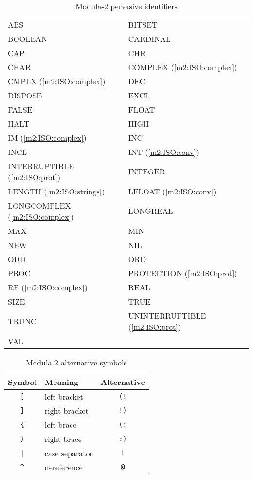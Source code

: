 \begin{table}[hbtp] \tt
\footnotesize
\begin{center}
\begin{tabular}{p{5.0cm}p{5.0cm}}
ABS             & BITSET    \\
BOOLEAN         & CARDINAL  \\
CAP             & CHR             \\
CHAR            & COMPLEX (\ref{m2:ISO:complex})  \\
CMPLX (\ref{m2:ISO:complex})  &  DEC             \\
DISPOSE         & EXCL            \\
FALSE           & FLOAT     \\
HALT            & HIGH      \\
IM (\ref{m2:ISO:complex})       & INC             \\
INCL            & INT (\ref{m2:ISO:conv})      \\
INTERRUPTIBLE (\ref{m2:ISO:prot})  & INTEGER   \\
LENGTH (\ref{m2:ISO:strings})   & LFLOAT (\ref{m2:ISO:conv})         \\
LONGCOMPLEX (\ref{m2:ISO:complex})    & LONGREAL  \\
MAX             & MIN             \\
NEW             & NIL             \\
ODD             & ORD             \\
PROC            & PROTECTION (\ref{m2:ISO:prot})     \\
RE (\ref{m2:ISO:complex})       & REAL            \\
SIZE            & TRUE      \\
TRUNC           & UNINTERRUPTIBLE (\ref{m2:ISO:prot}) \\
VAL              \\
\end{tabular}
\end{center}
\caption{Modula-2 pervasive identifiers}\label{table:m2:ISO:pervasive}
\end{table}

\begin{table}[htbp]
\begin{center}
\begin{tabular}{clc}
\bf Symbol  & \bf Meaning    & \bf Alternative  \\
\hline
  \verb+[+  & left bracket   & \verb+(!+        \\
  \verb+]+  & right bracket  & \verb+!)+        \\
  \verb+{+  & left brace     & \verb+(:+        \\
  \verb+}+  & right brace    & \verb+:)+        \\
  \verb+|+  & case separator & \verb+!+         \\
  \verb+^+  & dereference    & \verb+@+         \\
\end{tabular}
\end{center}
\caption{Modula-2 alternative symbols}\label{table:m2:ISO:alt}
\end{table}

